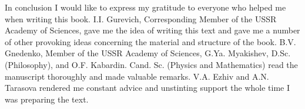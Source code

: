 In conclusion I would like to express my gratitude to everyone who
helped me when writing this book. I.I. Gurevich, Corresponding
Member of the USSR Academy of Sciences, gave me the idea of writing this text and gave me a number of other provoking ideas concerning the material and structure of the book. B.V. Gnedenko, Member of the USSR Academy of Sciences, G.Ya. Myakishev, D.Sc. (Philosophy), and O.F. Kabardin. Cand. Sc. (Physics and Mathematics) read the manuscript thoroughly and made valuable remarks. V.A. Ezhiv and A.N. Tarasova rendered me constant advice and unstinting support the whole time I was preparing the text. 

\cleardoublepage


